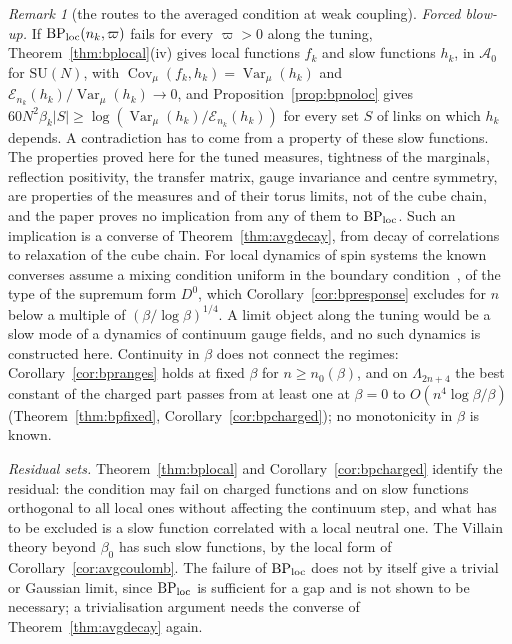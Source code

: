 \documentclass[aps,prd,twocolumn,superscriptaddress,nofootinbib,longbibliography,floatfix,amsmath,amssymb,10pt]{revtex4-2}
\theoremstyle{definition}
\theoremstyle{remark}
\newtheorem{remark}[theorem]{Remark}
\newcommand{\SU}{\mathrm{SU}}
\newcommand{\Cov}{\operatorname{Cov}}
\newcommand{\Var}{\operatorname{Var}}
\begin{document}
\begin{remark}[the routes to the averaged condition at weak
coupling]
\emph{Forced blow-up.} If $\mathrm{BP}_{\rm loc}(n_k,\varpi)$ fails for every
$\varpi>0$ along the tuning, Theorem~\ref{thm:bplocal}(iv) gives local
functions $f_k$ and slow functions $h_k$, in $\mathcal A_0$ for $\SU(N)$,
with $\Cov_\mu(f_k,h_k)=\Var_\mu(h_k)$ and $\mathcal E_{n_k}(h_k)/\Var_\mu(
h_k)\to0$, and Proposition~\ref{prop:bpnoloc} gives $60N^2\beta_k\lvert
S\rvert\ge\log(\Var_\mu(h_k)/\mathcal E_{n_k}(h_k))$ for every set $S$ of
links on which $h_k$ depends. A contradiction has to come from a property of these slow
functions. The properties proved here for the tuned measures, tightness of
the marginals, reflection positivity, the transfer matrix, gauge invariance
and centre symmetry, are properties of the measures and of their torus
limits, not of the cube chain, and the paper proves no implication from any
of them to $\mathrm{BP}_{\rm loc}$. Such an implication is a converse of
Theorem~\ref{thm:avgdecay}, from decay of correlations to relaxation of the
cube chain. For local dynamics of spin systems the known converses assume a
mixing condition uniform in the boundary condition~\cite{Mar99}, of the type
of the supremum form $D^0$, which Corollary~\ref{cor:bpresponse} excludes for
$n$ below a multiple of $(\beta/\log\beta)^{1/4}$. A limit object along the
tuning would be a slow mode of a dynamics of continuum gauge fields, and no
such dynamics is constructed here. Continuity in $\beta$ does not connect
the regimes: Corollary~\ref{cor:bpranges} holds at fixed $\beta$ for $n\ge
n_0(\beta)$, and on $\Lambda_{2n+4}$ the best constant of the charged part
passes from at least one at $\beta=0$ to $O(n^4\log\beta/\beta)$
(Theorem~\ref{thm:bpfixed}, Corollary~\ref{cor:bpcharged}); no monotonicity in
$\beta$ is known.

\emph{Residual sets.} Theorem~\ref{thm:bplocal} and
Corollary~\ref{cor:bpcharged} identify the residual: the condition may fail
on charged functions and on slow functions orthogonal to all local ones
without affecting the continuum step, and what has to be excluded is a slow
function correlated with a local neutral one. The Villain theory beyond
$\beta_0$ has such slow functions, by the local form of
Corollary~\ref{cor:avgcoulomb}. The failure of $\mathrm{BP}_{\rm loc}$ does
not by itself give a trivial or Gaussian limit, since $\mathrm{BP}_{\rm loc}$
is sufficient for a gap and is not shown to be necessary; a trivialisation
argument needs the converse of Theorem~\ref{thm:avgdecay} again.


\end{remark}
\end{document}
